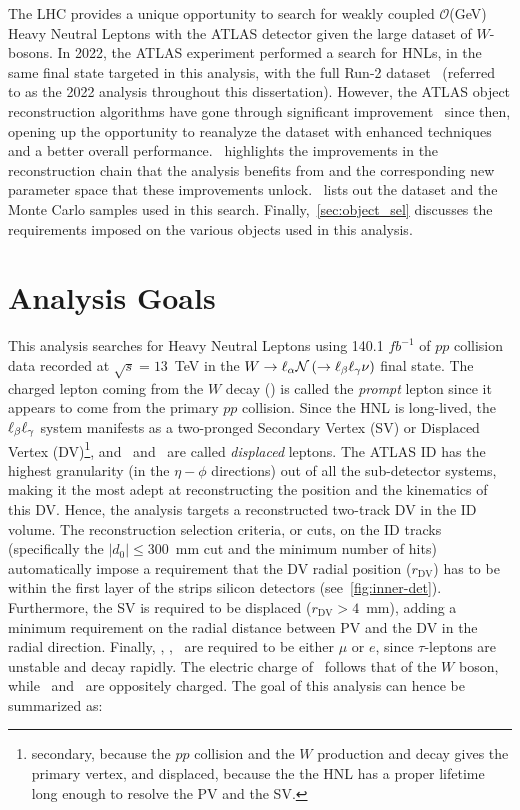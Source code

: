 The LHC provides a unique opportunity to search for weakly coupled $\mathcal{O}$(GeV) Heavy Neutral Leptons with the ATLAS detector given the large dataset of $W$-bosons. In 2022, the ATLAS experiment performed a search for HNLs, in the same final state targeted in this analysis, with the full Run-2 dataset~\cite{PhysRevLett.131.061803} (referred to as the 2022 analysis throughout this dissertation). However, the ATLAS object reconstruction algorithms have gone through significant improvement~\cite{atlascollaboration2023software} since then, opening up the opportunity to reanalyze the dataset with enhanced techniques and a better overall performance.~ highlights the improvements in the reconstruction chain that the analysis benefits from and the corresponding new parameter space that these improvements unlock.~ lists out the dataset and the Monte Carlo samples used in this search. Finally,~\cref{sec:object_sel} discusses the requirements imposed on the various objects used in this analysis.


\section{Analysis Goals}\label{sec:ana_goals}

This analysis searches for Heavy Neutral Leptons using 140.1 $fb^{-1}$ of $pp$ collision data recorded at $\sqrt{s}=13$~TeV in the $W\rightarrow \ell_\alpha \mathcal{N}\left(\rightarrow\ell_\beta\ell_\gamma\nu \right)$ final state. The charged lepton coming from the $W$ decay (\ela) is called the \textit{prompt} lepton since it appears to come from the primary $pp$ collision. Since the HNL is long-lived, the $\ell_\beta\ell_\gamma$ system manifests as a two-pronged Secondary Vertex (SV) or Displaced Vertex (DV)\footnote{secondary, because the $pp$ collision and the $W$ production and decay gives the primary vertex, and displaced, because the the HNL has a proper lifetime long enough to resolve the PV and the SV.}, and \elb~and \elg~are called \textit{displaced} leptons. The ATLAS ID has the highest granularity (in the $\eta-\phi$ directions) out of all the sub-detector systems, making it the most adept at reconstructing the position and the kinematics of this DV. Hence, the analysis targets a reconstructed two-track DV in the ID volume. The reconstruction selection criteria, or cuts, on the ID tracks (specifically the $|d_0|\leq 300$~mm cut and the minimum number of hits) automatically impose a requirement that the DV radial position ($r_\mathrm{DV}$) has to be within the first layer of the strips silicon detectors (see~\cref{fig:inner-det}). Furthermore, the SV is required to be displaced ($r_\mathrm{DV}>4$~mm), adding a minimum requirement on the radial distance between PV and the DV in the radial direction. Finally, \ela, \elb, \elg~are required to be either $\mu$ or $e$, since $\tau$-leptons are unstable and decay rapidly. The electric charge of \ela~follows that of the $W$ boson, while \elb~and \elg~are oppositely charged. The goal of this analysis can hence be summarized as:

